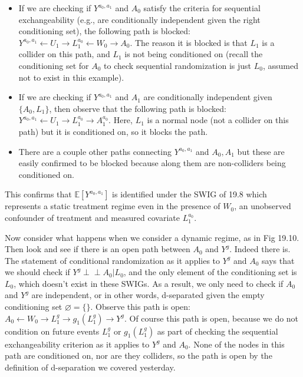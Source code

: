 \documentclass[11pt]{article}
\newcommand{\independent}[0]{\perp\!\!\!\perp}
\begin{document}
\begin{itemize}
\item If we are checking if $Y^{a_0, a_1}$ and $A_0$ satisfy the criteria for sequential exchangeability (e.g., are conditionally independent given the right conditioning set), 
the following path is blocked: $Y^{a_0, a_1} \leftarrow U_1 \rightarrow
L_1^{a_0} \leftarrow W_0 \rightarrow A_0$.  The reason it is blocked is that
$L_1$ is a collider on this path, and $L_1$ is not being conditioned on (recall
the conditioning set for $A_0$ to check sequential randomization is just $L_0$,
assumed not to exist in this example). 
\item If we are checking if $Y^{a_0, a_1}$ and $A_1$ are conditionally independent given $\{ A_0, L_1 \}$, 
then observe that the following path is blocked: $Y^{a_0, a_1} \leftarrow U_1 \rightarrow \boxed{L_1^{a_0}} \rightarrow A_1^{a_0}$. Here, $L_1$ is a normal node (not a collider on this path) but it is conditioned on, so it blocks the path. 
\item There are a couple other paths connecting $Y^{a_0, a_1}$ and $A_0, A_1$ but these are 
easily confirmed to be blocked because along them are non-colliders being conditioned on.
\end{itemize}

This confirms that $\mathbb E[Y^{a_0, a_1}]$ is identified under the SWIG of 19.8 which represents 
a static treatment regime even in the presence of $W_0$, an unobserved confounder of treatment and
measured covariate $L_1^{a_0}$. 

Now consider what happens when we consider a dynamic regime, as in Fig 19.10. 
Then look and see if there is an open path between $A_0$ and $Y^g$.  Indeed there is. 
The statement of conditional randomization as it applies to $Y^g$ and $A_0$ says 
that we should check if $Y^g \independent A_0 | L_0$, and the only element of the conditioning set 
is $L_0$, which doesn't exist in these SWIGs. As a result, we only need to check 
if $A_0$ and $Y^g$ are independent, or in other words, d-separated given the
empty conditioning set $\varnothing = \{ \}$. Observe this path is open: $A_0
\leftarrow W_0 \rightarrow L_1^g \rightarrow g_1(L_1^g) \rightarrow Y^g$. Of
course this path is open, because we do not condition on future events $L_1^g$
or $g_1(L_1^g)$ as part of checking the sequential exchangeability criterion as
it applies to $Y^g$ and $A_0$. None of the nodes in this path are conditioned on,
nor are they colliders, so the path is open by the definition of d-separation we covered yesterday. 
\end{document}
